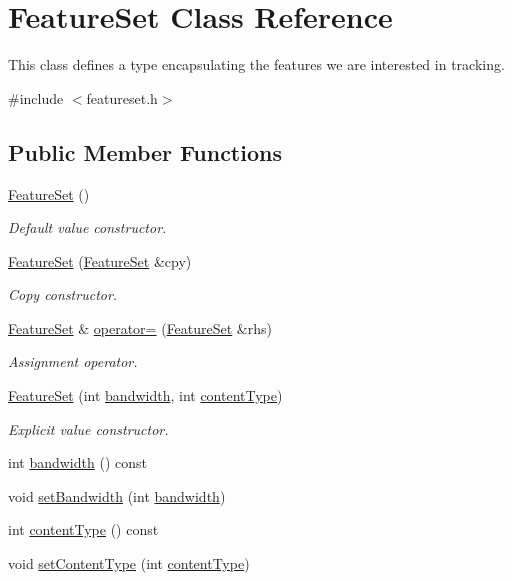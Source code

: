 \hypertarget{classFeatureSet}{\section{Feature\-Set Class Reference}
\label{classFeatureSet}
}


This class defines a type encapsulating the features we are interested in tracking.  




{\ttfamily \#include $<$featureset.\-h$>$}

\subsection*{Public Member Functions}
\begin{DoxyCompactItemize}
\item 
\hyperlink{classFeatureSet_ad6569f9f2143e38bf9c1378d55cd2989}{Feature\-Set} ()
\begin{DoxyCompactList}\small\item\em Default value constructor. \end{DoxyCompactList}\item 
\hyperlink{classFeatureSet_a53ceec8da14074eab01394ecef16d105}{Feature\-Set} (\hyperlink{classFeatureSet}{Feature\-Set} \&cpy)
\begin{DoxyCompactList}\small\item\em Copy constructor. \end{DoxyCompactList}\item 
\hyperlink{classFeatureSet}{Feature\-Set} \& \hyperlink{classFeatureSet_a6a2c0ba84a4cbe182b68909e58ab094b}{operator=} (\hyperlink{classFeatureSet}{Feature\-Set} \&rhs)
\begin{DoxyCompactList}\small\item\em Assignment operator. \end{DoxyCompactList}\item 
\hyperlink{classFeatureSet_afb3fe8535abb9373a71eeb44e0462ca0}{Feature\-Set} (int \hyperlink{classFeatureSet_a53c3d1d1d34efe2cd249f51af1a3857b}{bandwidth}, int \hyperlink{classFeatureSet_a9501ef16be4a0d58f1b9ac1834dbfad8}{content\-Type})
\begin{DoxyCompactList}\small\item\em Explicit value constructor. \end{DoxyCompactList}\item 
int \hyperlink{classFeatureSet_a53c3d1d1d34efe2cd249f51af1a3857b}{bandwidth} () const 
\item 
void \hyperlink{classFeatureSet_a95eb00f3b683d127d43dd8cc5e846852}{set\-Bandwidth} (int \hyperlink{classFeatureSet_a53c3d1d1d34efe2cd249f51af1a3857b}{bandwidth})
\item 
int \hyperlink{classFeatureSet_a9501ef16be4a0d58f1b9ac1834dbfad8}{content\-Type} () const 
\item 
void \hyperlink{classFeatureSet_a49aae68970a9837fab07caf49b92837b}{set\-Content\-Type} (int \hyperlink{classFeatureSet_a9501ef16be4a0d58f1b9ac1834dbfad8}{content\-Type})
\end{DoxyCompactItemize}



